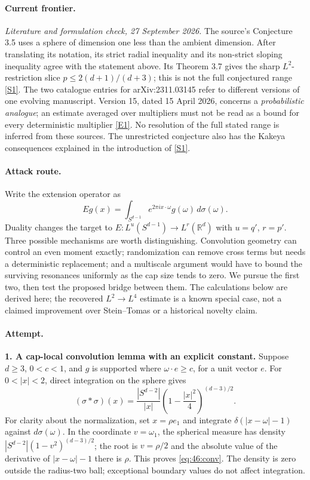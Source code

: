 \documentclass[11pt,a4paper]{article}
\newcommand{\R}{\mathbb{R}}
\newcommand{\sref}[2]{\hyperlink{source:#1:#2}{[S#2]}}
\newcommand{\eref}[2]{\hyperlink{extra:#1:#2}{[E#2]}}
\numberwithin{equation}{section}
\begin{document}
\paragraph{Current frontier.}
\textit{Literature and formulation check, 27 September 2026.}
The source's Conjecture 3.5 uses a sphere of dimension one less than the
ambient dimension. After translating its notation, its strict radial
inequality and its non-strict sloping inequality agree with the statement
above. Its Theorem 3.7 gives the sharp $L^2$-restriction slice
$p\le 2(d+1)/(d+3)$; this is not the full conjectured range
\sref{46}{1}. The two catalogue entries for arXiv:2311.03145 refer to different
versions of one evolving manuscript. Version 15, dated 15 April 2026, concerns
a \emph{probabilistic analogue}; an estimate averaged over multipliers must
not be read as a bound for every deterministic multiplier
\eref{46}{1}. No resolution of the full stated range is inferred from these
sources. The unrestricted conjecture also has the Kakeya consequences
explained in the introduction of \sref{46}{1}.

\paragraph{Attack route.}
Write the extension operator as
\[
 Eg(x)=\int_{S^{d-1}} e^{2\pi i x\cdot\omega}g(\omega)\,d\sigma(\omega).
\]
Duality changes the target to $E:L^u(S^{d-1})\to L^r(\R^d)$ with
$u=q'$, $r=p'$. Three possible mechanisms are worth distinguishing.
Convolution geometry can control an even moment exactly; randomization can
remove cross terms but needs a deterministic replacement; and a multiscale
argument would have to bound the surviving resonances uniformly as the cap
size tends to zero. We pursue the first two, then test the proposed bridge
between them. The calculations below are derived here; the recovered
$L^2\to L^4$ estimate is a known special case, not a claimed improvement over
Stein--Tomas or a historical novelty claim.

\paragraph{Attempt.}
\textbf{1. A cap-local convolution lemma with an explicit constant.}
Suppose $d\ge3$, $0<c<1$, and $g$ is supported where
$\omega\cdot e\ge c$, for a unit vector $e$. For $0<|x|<2$, direct
integration on the sphere gives
\begin{equation}\label{eq:46:conv}
 (\sigma*\sigma)(x)=\frac{|S^{d-2}|}{|x|}
       \left(1-\frac{|x|^2}{4}\right)^{(d-3)/2}.
\end{equation}
For clarity about the normalization, set $x=\rho e_1$ and integrate
$\delta(|x-\omega|-1)$ against $d\sigma(\omega)$. In the coordinate
$v=\omega_1$, the spherical measure has density
$|S^{d-2}|(1-v^2)^{(d-3)/2}$; the root is $v=\rho/2$ and the absolute
value of the derivative of $|x-\omega|-1$ there is $\rho$. This proves
\eqref{eq:46:conv}. The density is zero outside the radius-two ball;
exceptional boundary values do not affect integration.
\end{document}
